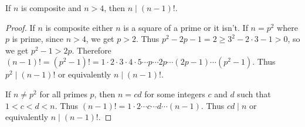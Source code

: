 \begin{lemma}
  If \( n \) is composite and \( n > 4 \), then \( n \mid (n - 1)! \).
\end{lemma}

\begin{proof}
  If \( n \) is composite either \( n \) is a square of a prime or it
  isn't. If \( n = p^2 \) where \( p \) is prime, since \( n > 4 \),
  we get \( p > 2 \). Thus \( p^2 - 2p - 1 = 2 \ge 3^2 - 2 \cdot 3 - 1
  > 0 \), so we get \( p^2 - 1 > 2p \). Therefore \( (n - 1)! = (p^2 -
  1)! = 1 \cdot 2 \cdot 3 \cdot 4 \cdot 5 \cdots p \cdots 2p \cdots
  (2p - 1) \cdots (p^2 - 1) \). Thus \( p^2 \mid (n - 1)! \) or
  equivalently \( n \mid (n - 1)! \).

  If \( n \ne p^2 \) for all primes \( p \), then \( n = cd \) for
  some integers \( c \) and \( d \) such that \( 1 < c < d < n \).
  Thus \( (n - 1)! = 1 \cdot 2 \cdots c \cdots d \cdots (n - 1) \).
  Thus \( cd \mid n \) or equivalently \( n \mid (n - 1)! \).
\end{proof}
